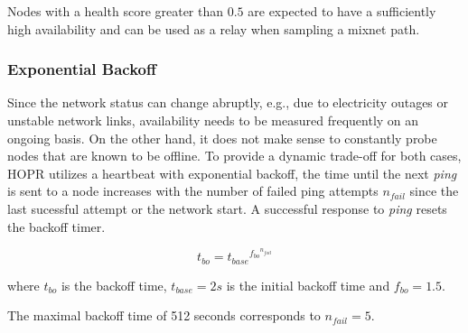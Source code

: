 Nodes with a health score greater than $0.5$ are expected to have a sufficiently high availability and can be used as a relay when sampling a mixnet path.

\subsubsection{Exponential Backoff}
\label{sec:p2p:exponential-backoff}

Since the network status can change abruptly, e.g., due to electricity outages or unstable network links, availability needs to be measured frequently on an ongoing basis. On the other hand, it does not make sense to constantly probe nodes that are known to be offline. To provide a dynamic trade-off for both cases, HOPR utilizes a heartbeat with exponential backoff, the time until the next \textit{ping} is sent to a node increases with the number of failed ping attempts $n_{fail}$ since the last sucessful attempt or the network start. A successful response to \textit{ping} resets the backoff timer.

$$ t_{bo} = {t_{base}}^{{f_{bo}}^{n_{fail}}} $$

where $t_{bo}$ is the backoff time, $t_{base} = 2s$ is the initial backoff time and $f_{bo} = 1.5$.

The maximal backoff time of 512 seconds corresponds to $n_{fail} = 5$.

